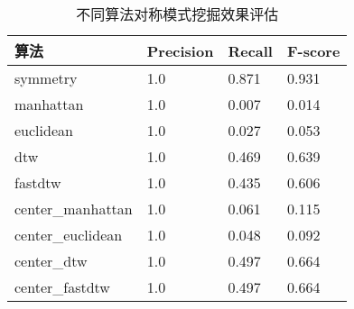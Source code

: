 \begin{table}
  \centering
  \caption{不同算法对称模式挖掘效果评估}
  \begin{tabular}{llll}
    \toprule
    算法          & Precision   & Recall & F-score                        \\
    \midrule
    symmetry          & 1.0   & 0.871 & 0.931   \\
    manhattan         & 1.0  & 0.007 & 0.014 \\
    euclidean         & 1.0  & 0.027 & 0.053 \\
    dtw               & 1.0  & 0.469 & 0.639  \\
    fastdtw           & 1.0  & 0.435 & 0.606 \\
    center\_manhattan & 1.0  & 0.061 & 0.115 \\
    center\_euclidean & 1.0  & 0.048 & 0.092  \\
    center\_dtw       & 1.0  & 0.497 & 0.664  \\
    center\_fastdtw   & 1.0  & 0.497 & 0.664 \\
    \bottomrule
  \end{tabular}
  \label{tab:experiment_global_algo}
\end{table}

